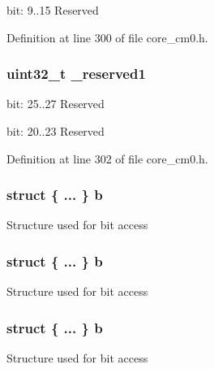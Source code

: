 bit\+: 9..15 Reserved 

Definition at line 300 of file core\+\_\+cm0.\+h.

\subsubsection[{\texorpdfstring{\+\_\+reserved1}{_reserved1}}]{\setlength{\rightskip}{0pt plus 5cm}uint32\+\_\+t \+\_\+reserved1}\hypertarget{unionx_p_s_r___type_a959a73d8faee56599b7e792a7c5a2d16}{}\label{unionx_p_s_r___type_a959a73d8faee56599b7e792a7c5a2d16}
bit\+: 25..27 Reserved

bit\+: 20..23 Reserved 

Definition at line 302 of file core\+\_\+cm0.\+h.

\subsubsection[{\texorpdfstring{b}{b}}]{\setlength{\rightskip}{0pt plus 5cm}struct \{ ... \}   b}\hypertarget{unionx_p_s_r___type_a8d8c45d946ef8df11f4cac72c667e98b}{}\label{unionx_p_s_r___type_a8d8c45d946ef8df11f4cac72c667e98b}
Structure used for bit access 
\subsubsection[{\texorpdfstring{b}{b}}]{\setlength{\rightskip}{0pt plus 5cm}struct \{ ... \}   b}\hypertarget{unionx_p_s_r___type_a6dd038bd7a3f7f88ccfe946c31d8d83a}{}\label{unionx_p_s_r___type_a6dd038bd7a3f7f88ccfe946c31d8d83a}
Structure used for bit access 
\subsubsection[{\texorpdfstring{b}{b}}]{\setlength{\rightskip}{0pt plus 5cm}struct \{ ... \}   b}\hypertarget{unionx_p_s_r___type_a5fe7b3d4251f5516a5cc744f416a600a}{}\label{unionx_p_s_r___type_a5fe7b3d4251f5516a5cc744f416a600a}
Structure used for bit access 
